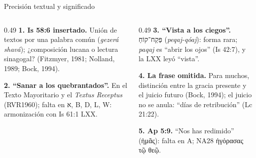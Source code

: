 \documentclass[hyperref={bookmarks=false},aspectratio=169]{beamer}
\newcommand{\heb}[1]{\mbox{\foreignlanguage{hebrew}{#1}}}
\newcommand{\grc}[1]{\foreignlanguage{ancientgreek}{#1}}
\begin{document}
\begin{frame}{Precisión textual y significado}
\begin{columns}[t,onlytextwidth]
\begin{column}{0.49\textwidth}\scriptsize\RaggedRight
\textbf{\textcolor{tierraroja}{1. Is 58:6 insertado.}} Unión de textos por una palabra común (\emph{gezerá shavá}); ¿composición lucana o lectura sinagogal? (Fitzmyer, 1981; Nolland, 1989; Bock, 1994).\par\medskip
\textbf{\textcolor{tierraroja}{2. ``Sanar a los quebrantados''.}} En el Texto Mayoritario y el \emph{Textus Receptus} (RVR1960); falta en \heb{א}, B, D, L, W: armonización con Is 61:1 LXX.
\end{column}
\begin{column}{0.49\textwidth}\scriptsize\RaggedRight
\textbf{\textcolor{tierraroja}{3. ``Vista a los ciegos''.}} \heb{פְּקַח־קוֹחַ} (\emph{peqaj-qóaj}): forma rara; \emph{paqaj} es ``abrir los ojos'' (Is 42:7), y la LXX leyó ``vista''.\par\medskip
\textbf{\textcolor{tierraroja}{4. La frase omitida.}} Para muchos, distinción entre la gracia presente y el juicio futuro (Bock, 1994); el juicio no se anula: ``días de retribución'' (Lc 21:22).\par\medskip
\textbf{\textcolor{tierraroja}{5. Ap 5:9.}} ``Nos has redimido'' (\grc{ἡμᾶς}): falta en A; NA28 \grc{ἠγόρασας τῷ θεῷ}.
\end{column}
\end{columns}
\end{frame}
\end{document}
